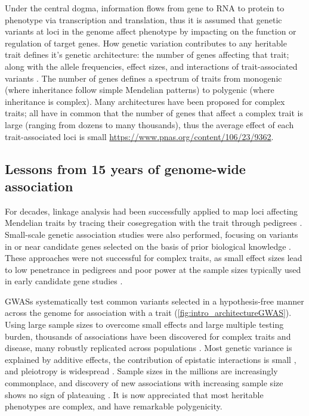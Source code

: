 \begin{outline}
\1 Under the central dogma, information flows from gene to RNA to protein to phenotype via transcription and translation, 
thus it is assumed that genetic variants at loci in the genome affect phenotype by impacting on the function or regulation of target genes.
How genetic variation contributes to any heritable trait defines it's genetic architecture: the number of genes affecting that trait; along with the allele frequencies, effect sizes, and interactions of trait-associated variants \autocite{visscher2019Fisher1918Paper}.
The number of genes defines a spectrum of traits from monogenic (where inheritance follow simple Mendelian patterns) to polygenic (where inheritance is complex).
Many architectures have been proposed for complex traits; all have in common that the number of genes that affect a complex trait is large (ranging from dozens to many thousands),
thus the average effect of each trait-associated loci is small \autocite{gibson2011RareCommonVariants,boyle2017ExpandedViewComplex} \url{https://www.pnas.org/content/106/23/9362}.

\subsection{Lessons from 15 years of genome-wide association}

\1 For decades, linkage analysis had been successfully applied to map loci affecting Mendelian traits by tracing their cosegregation with the trait through pedigrees \autocite{visscher2012FiveYearsGWAS}.
Small-scale genetic association studies were also performed, focusing on variants in or near candidate genes selected on the basis of prior biological knowledge \autocite{hirschhorn2002ComprehensiveReviewGenetic}.
These approaches were not successful for complex traits, as small effect sizes lead to low penetrance in pedigrees \autocite{visscher2012FiveYearsGWAS}
and poor power at the sample sizes typically used in early candidate gene studies \autocite{border2019NoSupportHistorical}.

\1 \Glspl{GWAS} systematically test common variants selected in a hypothesis-free manner across the genome for association with a trait (\autoref{fig:intro_architectureGWAS}).
Using large sample sizes to overcome small effects and large multiple testing burden, thousands of associations have been discovered for complex traits and disease,
many robustly replicated across populations \autocite{visscher2012FiveYearsGWAS,visscher201710YearsGWAS}.
Most genetic variance is explained by additive effects, the contribution of epistatic interactions is small \autocite{visscher2019Fisher1918Paper}, 
and pleiotropy is widespread \autocite{visscher2012FiveYearsGWAS}.
Sample sizes in the millions are increasingly commonplace, 
and discovery of new associations with increasing sample size shows no sign of plateauing \autocite{tam2019BenefitsLimitationsGenomewide}.
It is now appreciated that most heritable phenotypes are complex, and have remarkable polygenicity.


\end{outline}
